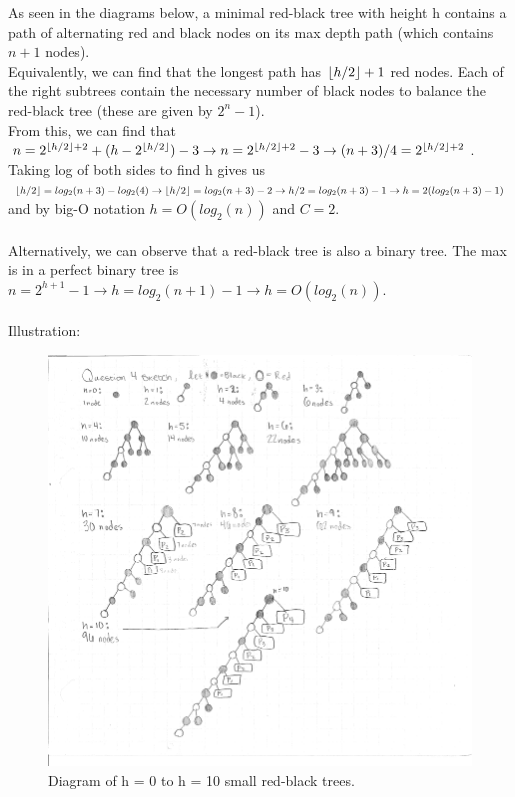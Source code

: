 \documentclass[11pt]{article}
\DeclarePairedDelimiter\floor{\lfloor}{\rfloor}
\begin{document}
As seen in the diagrams below, a minimal red-black tree with height h contains a path of alternating red and black nodes on its max depth path (which contains $n+1$ nodes). \\Equivalently, we can find that the longest path has $\floor*{h/2} + 1$ red nodes. Each of the right subtrees contain the necessary number of black nodes to balance the red-black tree (these are given by $2^n - 1$). \\From this, we can find that $n = 2^{\floor*{h/2}+2} + (h - 2^{\floor*{h/2}})-3 \\\rightarrow n = 2^{\floor*{h/2}+2} - 3 \\\rightarrow (n+3)/4 = 2^{\floor*{h/2}+2} $. \\Taking log of both sides to find h gives us $\floor*{h/2} = log_2(n+3) - log_2(4) \\\rightarrow \floor{h/2} = log_2(n+3) - 2 \\\rightarrow h/2 = log_2(n+3) - 1 \\\rightarrow h = 2(log_2(n+3) - 1)$ and by big-O notation $h = O(log_2(n))$ and $C = 2$.\\\\Alternatively, we can observe that a red-black tree is also a binary tree. The max is in a perfect binary tree is $ n = 2^{h+1}-1 \rightarrow h = log_2(n+1) - 1 \rightarrow h = O(log_2(n))$.\\\\Illustration:

\begin{figure}
  \begin{flushleft}
    \includegraphics[width=1.5\textwidth]{q4.png}
  \end{flushleft}
  \caption{Diagram of h = 0 to h = 10 small red-black trees.}
\end{figure}
\end{document}
